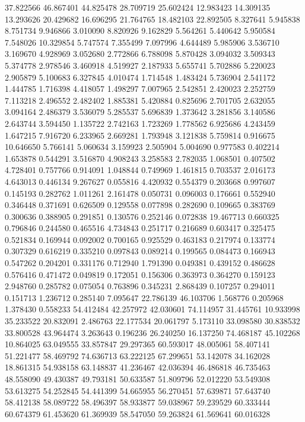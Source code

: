 37.822566
46.867401
44.825478
28.709719
25.602424
12.983423
14.309135
13.293626
20.429682
16.696295
21.764765
18.482103
22.892505
8.327641
5.945838
8.751734
9.946866
3.010090
8.820926
9.162829
5.564261
5.440642
5.950584
7.548026
10.329854
5.747574
7.355499
7.097996
4.644489
5.985906
3.536710
3.169670
4.928969
3.052680
2.772866
6.788098
5.870428
3.094032
3.509343
5.374778
2.978546
3.460918
4.519927
2.187933
5.655741
5.702886
5.220023
2.905879
5.100683
6.327845
4.010474
1.714548
1.483424
5.736904
2.541172
1.444785
1.716398
4.418057
1.498297
7.007965
2.542851
2.420023
2.252759
7.113218
2.496552
2.482402
1.885381
5.420884
0.825696
2.701705
2.632055
3.094164
2.486379
3.536079
5.285537
5.696839
1.373642
3.281856
3.140586
2.643744
3.594450
1.135722
2.742163
1.723269
1.778562
6.925686
4.243459
1.647215
7.916720
6.233965
2.669281
1.793948
3.121838
5.759814
0.916675
10.646650
5.766141
5.060634
3.159923
2.505904
5.004690
0.977583
0.402214
1.653878
0.544291
3.516870
4.908243
3.258583
2.782035
1.068501
0.407502
4.728401
0.757766
0.914091
1.048844
0.749969
1.461815
0.703537
2.016173
4.643013
0.446134
9.267627
0.055816
4.420932
0.554379
0.203668
0.997607
0.145193
0.282762
1.011261
2.161478
0.050731
0.096003
0.176661
0.552940
0.346448
0.371691
0.626509
0.129558
0.077898
0.282690
0.109665
0.383769
0.300636
0.388905
0.291851
0.130576
0.252146
0.072838
19.467713
0.660325
0.796846
0.244580
0.465516
4.734843
0.251717
0.216689
0.603417
0.325475
0.521834
0.169944
0.092002
0.700165
0.925529
0.463183
0.217974
0.133774
0.307329
0.616219
0.335210
0.097843
0.089214
0.199565
0.084473
0.166943
0.547262
0.204201
0.331176
0.712940
1.791390
0.049381
0.439152
0.486628
0.576416
0.471472
0.049819
0.172051
0.156306
0.363973
0.364270
0.159123
2.948760
0.285782
0.075054
0.763896
0.345231
2.868439
0.107257
0.294011
0.151713
1.236712
0.285140
7.095647
22.786139
46.103706
1.568776
0.205968
1.378430
0.558233
54.412484
42.257972
42.030601
74.114957
31.445761
10.933998
35.233522
20.832091
2.486763
22.177534
20.061797
5.173110
33.098580
30.838532
33.800528
43.964474
3.263643
0.196236
26.240250
16.137250
74.468187
45.102268
10.864025
63.049555
33.857847
29.297365
60.593017
48.005061
58.407141
51.221477
58.469792
74.636713
63.222125
67.299651
53.142078
34.162028
18.861315
54.938158
63.148837
41.236467
42.036394
46.486818
46.735463
48.558090
49.430387
49.793181
50.633587
51.809796
52.012220
53.549308
53.613275
54.252845
54.441399
54.665955
56.270451
57.639871
57.643740
58.412138
58.089722
58.496397
58.933877
59.038967
59.239529
60.333444
60.674379
61.453620
61.369939
58.547050
59.263824
61.569641
60.016328
